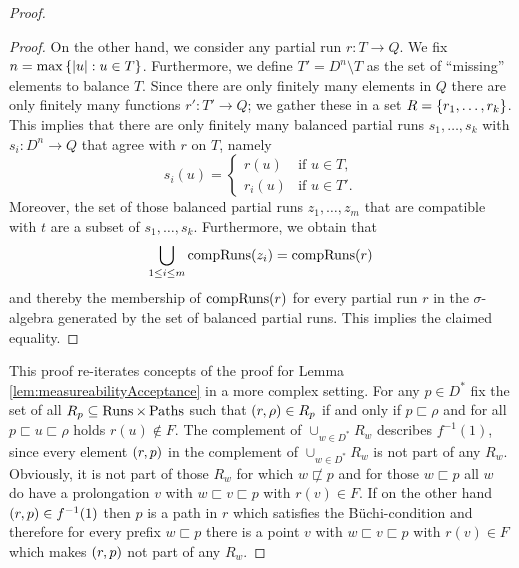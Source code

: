 \begin{proof}
\begin{proof}
    On the other hand, we consider any partial run $r:T\rightarrow Q$. We fix
    $n = \max\left\{\left\vert{u}\right\vert:u\in T\right\}$. Furthermore, we define 
    $T' = D^{n}\setminus T$ as the set of \enquote{missing} elements to balance
    $T$. Since there are only finitely many elements in $Q$ there are only
    finitely many functions $r':T'\rightarrow Q$; we gather these in a set
    $R = \left\{r_{1}, \dots, r_{k}\right\}$. This implies that there are only finitely
    many balanced partial runs $s_{1}, \dots, s_{k}$ with 
    $s_{i}:D^{n}\rightarrow Q$ that agree with $r$ on $T$, namely
    \begin{equation*}
      s_{i}(u) = \begin{cases}
        r(u)&\text{if }u\in T,\\
        r_{i}(u)&\text{if }u\in T'.
      \end{cases}
    \end{equation*}
    Moreover, the set of those balanced partial runs $z_{1}, \dots, z_{m}$ that 
    are compatible with $t$ are a subset of $s_{1}, \dots, s_{k}$. Furthermore, 
    we obtain that
    \begin{equation*}
      \bigcup_{1\leq i\leq m}\operatorname{compRuns}(z_{i}) = \operatorname{compRuns}(r)
    \end{equation*}
    and thereby the membership of $\operatorname{compRuns}(r)$ for every partial run $r$ in
    the $\sigma$-algebra generated by the set of balanced partial runs. This
    implies the claimed equality.
  \end{proof}

  This proof re-iterates concepts of the proof for Lemma 
  \ref{lem:measureabilityAcceptance} in a more complex setting. For any 
  $p\in D^{*}$ fix the set of all $R_{p}\subseteq\operatorname{Runs}\times\operatorname{Paths}$ such that
  $\left(r,\rho\right)\in R_{p}$ if and only if $p\sqsubset\rho$ and for all
  $p\sqsubset u\sqsubset\rho$ holds $r(u)\notin F$. The complement of
  $\cup_{w\in D^{*}}R_{w}$ describes $f^{-1}(1)$, since every
  element $\left(r,p\right)$ in the complement of $\cup_{w\in D^{*}}R_{w}$ is not
  part of any $R_{w}$. Obviously, it is not part of those $R_{w}$ for which
  $w\not\sqsubset p$ and for those $w\sqsubset p$ all $w$ do have a 
  prolongation $v$ with $w\sqsubset v\sqsubset p$ with $r(v)\in F$. If on the 
  other hand $\left(r,p\right)\in f^{-1}(1)$ then $p$ is a path in $r$ which 
  satisfies the Büchi-condition and therefore for every prefix $w\sqsubset p$ 
  there is a point $v$ with $w\sqsubset v\sqsubset p$ with $r(v)\in F$ which
  makes $\left(r,p\right)$ not part of any $R_{w}$.


\end{proof}
